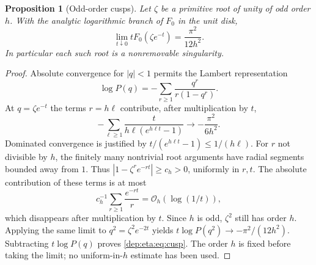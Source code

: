 \documentclass[11pt]{article}
\newtheorem{proposition}[theorem]{Proposition}
\theoremstyle{definition}\newtheorem{definition}[theorem]{Definition}
\theoremstyle{remark}\newtheorem{remark}[theorem]{Remark}
\newcommand{\OO}{\mathcal O}
\begin{document}
\begin{proposition}[Odd-order cusps]\label{dep:eta:prop:cusps}
Let $\zeta$ be a primitive root of unity of odd order $h$. With the
analytic logarithmic branch of $F_0$ in the unit disk,
\begin{equation}\label{dep:eta:eq:cusp}
 \lim_{t\downarrow0}tF_0(\zeta e^{-t})=\frac{\pi^2}{12h^2}.
\end{equation}
In particular each such root is a nonremovable singularity.
\end{proposition}
\begin{proof}
Absolute convergence for $|q|<1$ permits the Lambert representation
\[
 \log P(q)=-\sum_{r\ge1}\frac{q^r}{r(1-q^r)}.
\]
At $q=\zeta e^{-t}$ the terms $r=h\ell$ contribute, after
multiplication by $t$,
\[
 -\sum_{\ell\ge1}\frac{t}{h\ell(e^{h\ell t}-1)}
       \longrightarrow -\frac{\pi^2}{6h^2}.
\]
Dominated convergence is justified by
$t/(e^{h\ell t}-1)\le1/(h\ell)$.
For $r$ not divisible by $h$, the finitely many nontrivial root
arguments have radial segments bounded away from $1$. Thus
$|1-\zeta^re^{-rt}|\ge c_h>0$, uniformly in $r,t$. The absolute
contribution of these terms is at most
\[
 c_h^{-1}\sum_{r\ge1}\frac{e^{-rt}}r=\OO_h(\log(1/t)),
\]
which disappears after multiplication by $t$.
Since $h$ is odd, $\zeta^2$ still has order $h$. Applying the same
limit to $q^2=\zeta^2e^{-2t}$ yields
$t\log P(q^2)\to-\pi^2/(12h^2)$.
Subtracting $t\log P(q)$ proves \eqref{dep:eta:eq:cusp}.
The order $h$ is fixed before taking the limit; no uniform-in-$h$
estimate has been used.
\end{proof}
\end{document}
